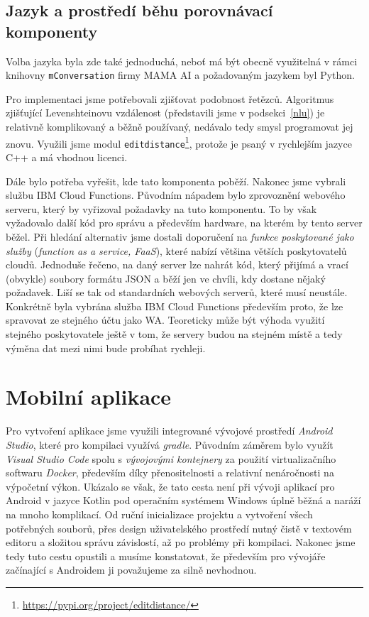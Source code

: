 \subsection{Jazyk a prostředí běhu porovnávací komponenty}

Volba jazyka byla zde také jednoduchá, neboť má být obecně využitelná v rámci
knihovny \texttt{mConversation} firmy MAMA AI a požadovaným jazykem byl Python.

Pro implementaci jsme potřebovali zjišťovat podobnost řetězců. Algoritmus
zjišťující Levenshteinovu vzdálenost (představili jsme v podsekci~\ref{nlu})
je relativně komplikovaný a běžně používaný, nedávalo tedy
smysl programovat jej znovu. Využili jsme modul
\texttt{editdistance}\footnote{\url{https://pypi.org/project/editdistance/}},
protože je psaný v rychlejším jazyce C++ a má vhodnou licenci.

Dále bylo potřeba vyřešit, kde tato komponenta poběží. Nakonec jsme vybrali
službu IBM Cloud Functions. Původním nápadem bylo
zprovoznění webového serveru, který by vyřizoval požadavky na tuto komponentu.
To by však vyžadovalo další kód pro správu a především hardware, na kterém by
tento server běžel. Při hledání alternativ jsme dostali doporučení na
\textit{funkce poskytované jako služby} (\textit{function as a service, FaaS}),
které nabízí většina větších poskytovatelů cloudů. Jednoduše řečeno, na daný
server lze nahrát kód, který přijímá a vrací (obvykle) soubory formátu JSON a
běží jen ve chvíli, kdy dostane nějaký požadavek. Liší se tak od standardních
webových serverů, které musí  neustále. Konkrétně byla vybrána
služba IBM Cloud Functions především proto, že lze spravovat ze stejného účtu jako
WA. Teoreticky může být výhoda využití stejného poskytovatele ještě v tom, že
servery budou na stejném místě a tedy výměna dat mezi nimi bude probíhat rychleji.

\section{Mobilní aplikace}\label{app}

Pro vytvoření aplikace jsme využili integrované vývojové prostředí
\textit{Android Studio}, které pro kompilaci využívá \textit{gradle}.
Původním záměrem bylo využít \textit{Visual Studio Code}
spolu s \textit{vývojovými kontejnery} za použití virtualizačního softwaru
\textit{Docker}, především díky přenositelnosti a relativní nenáročnosti
na výpočetní výkon. Ukázalo se však, že tato cesta není při vývoji aplikací
pro Android v jazyce Kotlin pod operačním systémem Windows úplně běžná a
naráží na mnoho komplikací. Od ruční inicializace projektu a vytvoření všech
potřebných souborů, přes design uživatelského
prostředí nutný čistě v textovém editoru a složitou správu závislostí,
až po problémy při kompilaci. Nakonec jsme tedy tuto cestu opustili a
musíme konstatovat, že především pro vývojáře začínající s Androidem
ji považujeme za silně nevhodnou.

